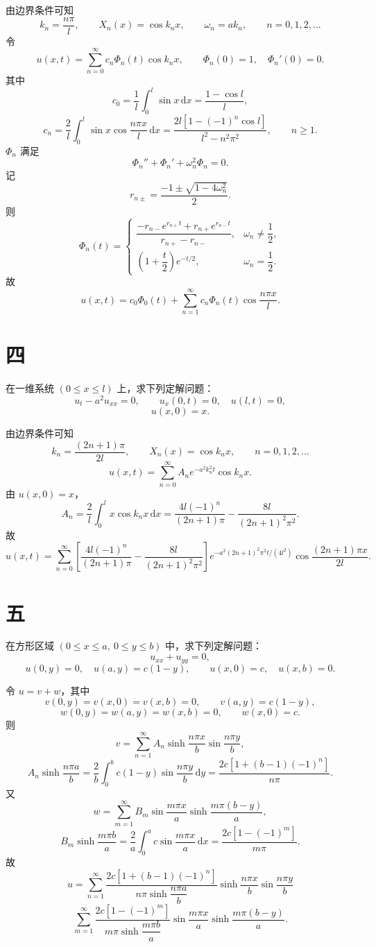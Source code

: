 \documentclass[UTF8,zihao=-4]{ctexart}
\begin{document}
由边界条件可知
\[
k_n=\dfrac{n\pi}{l},\qquad X_n(x)=\cos k_nx,\qquad
\omega_n=ak_n,\qquad n=0,1,2,\dots
\]
令
\[
u(x,t)=\sum_{n=0}^{\infty}c_n\Phi_n(t)\cos k_nx,\qquad
\Phi_n(0)=1,\quad \Phi_n'(0)=0.
\]
其中
\[
c_0=\dfrac{1}{l}\int_0^l\sin x\,\mathrm{d}x=\dfrac{1-\cos l}{l},
\]
\[
c_n=\dfrac{2}{l}\int_0^l\sin x\cos\dfrac{n\pi x}{l}\,\mathrm{d}x
=\dfrac{2l\left[1-(-1)^n\cos l\right]}{l^2-n^2\pi^2},\qquad n\ge1.
\]
$\Phi_n$ 满足
\[
\Phi_n''+\Phi_n'+\omega_n^2\Phi_n=0.
\]
记
\[
r_{n\pm}=\dfrac{-1\pm\sqrt{1-4\omega_n^2}}{2}.
\]
则
\[
\Phi_n(t)=
\begin{cases}
\dfrac{-r_{n-}e^{r_{n+}t}+r_{n+}e^{r_{n-}t}}{r_{n+}-r_{n-}},
&\omega_n\ne\dfrac12,\\[8pt]
\left(1+\dfrac{t}{2}\right)e^{-t/2},&\omega_n=\dfrac12.
\end{cases}
\]
故
\[
u(x,t)=c_0\Phi_0(t)+\sum_{n=1}^{\infty}
c_n\Phi_n(t)\cos\dfrac{n\pi x}{l}.
\]

\section*{四}

在一维系统 $(0\le x\le l)$ 上，求下列定解问题：
\[
u_t-a^2u_{xx}=0,\qquad
u_x(0,t)=0,\quad u(l,t)=0,
\]
\[
u(x,0)=x.
\]

由边界条件可知
\[
k_n=\dfrac{(2n+1)\pi}{2l},\qquad X_n(x)=\cos k_nx,\qquad n=0,1,2,\dots
\]
\[
u(x,t)=\sum_{n=0}^{\infty}A_ne^{-a^2k_n^2t}\cos k_nx.
\]
由 $u(x,0)=x$，
\[
A_n=\dfrac{2}{l}\int_0^lx\cos k_nx\,\mathrm{d}x
=\dfrac{4l(-1)^n}{(2n+1)\pi}
-\dfrac{8l}{(2n+1)^2\pi^2}.
\]
故
\[
u(x,t)=\sum_{n=0}^{\infty}
\left[
\dfrac{4l(-1)^n}{(2n+1)\pi}
-\dfrac{8l}{(2n+1)^2\pi^2}
\right]
e^{-a^2(2n+1)^2\pi^2t/(4l^2)}
\cos\dfrac{(2n+1)\pi x}{2l}.
\]

\section*{五}

在方形区域 $(0\le x\le a,\ 0\le y\le b)$ 中，求下列定解问题：
\[
u_{xx}+u_{yy}=0,
\]
\[
u(0,y)=0,\quad u(a,y)=c(1-y),\qquad
u(x,0)=c,\quad u(x,b)=0.
\]

令 $u=v+w$，其中
\[
v(0,y)=v(x,0)=v(x,b)=0,\qquad v(a,y)=c(1-y),
\]
\[
w(0,y)=w(a,y)=w(x,b)=0,\qquad w(x,0)=c.
\]
则
\[
v=\sum_{n=1}^{\infty}A_n\sinh\dfrac{n\pi x}{b}\sin\dfrac{n\pi y}{b},
\]
\[
A_n\sinh\dfrac{n\pi a}{b}
=\dfrac{2}{b}\int_0^bc(1-y)\sin\dfrac{n\pi y}{b}\,\mathrm{d}y
=\dfrac{2c\left[1+(b-1)(-1)^n\right]}{n\pi}.
\]
又
\[
w=\sum_{m=1}^{\infty}B_m\sin\dfrac{m\pi x}{a}\sinh\dfrac{m\pi(b-y)}{a},
\]
\[
B_m\sinh\dfrac{m\pi b}{a}
=\dfrac{2}{a}\int_0^ac\sin\dfrac{m\pi x}{a}\,\mathrm{d}x
=\dfrac{2c\left[1-(-1)^m\right]}{m\pi}.
\]
故
\[
u=\sum_{n=1}^{\infty}
\dfrac{2c\left[1+(b-1)(-1)^n\right]}{n\pi\sinh\dfrac{n\pi a}{b}}
\sinh\dfrac{n\pi x}{b}\sin\dfrac{n\pi y}{b}
\]
\[
\sum_{m=1}^{\infty}
\dfrac{2c\left[1-(-1)^m\right]}{m\pi\sinh\dfrac{m\pi b}{a}}
\sin\dfrac{m\pi x}{a}\sinh\dfrac{m\pi(b-y)}{a}.
\]
\end{document}
